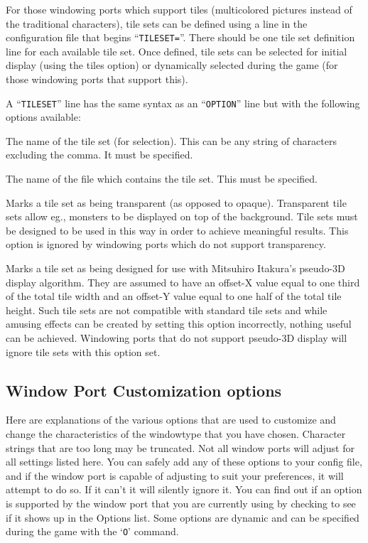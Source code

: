 
For those windowing ports which support tiles (multicolored pictures
instead of the traditional characters), tile sets can be defined using
a line in the configuration file that begins ``{\tt TILESET=}''. There should
be one tile set definition line for each available tile set. Once defined,
tile sets can be selected for initial display (using the tiles option) or
dynamically selected during the game (for those windowing ports that
support this).

A ``{\tt TILESET}'' line has the same syntax as an ``{\tt OPTION}'' line but with
the following options available:
\blist{}

\item[\ib{name}]
The name of the tile set (for selection). This can be any string of characters
excluding the comma. It must be specified.

\item[\ib{file}]
The name of the file which contains the tile set. This must be specified.

\item[\ib{transparent}]
Marks a tile set as being transparent (as opposed to opaque). Transparent
tile sets allow eg., monsters to be displayed on top of the background.
Tile sets must be designed to be used in this way in order to achieve
meaningful results. This option is ignored by windowing ports which do
not support transparency.

\item[\ib{pseudo3D}]
Marks a tile set as being designed for use with Mitsuhiro Itakura's
pseudo-3D display algorithm. They are assumed to have an offset-X value
equal to one third of the total tile width and an offset-Y value equal
to one half of the total tile height. Such tile sets are not compatible
with standard tile sets and while amusing effects can be created by
setting this option incorrectly, nothing useful can be achieved. Windowing
ports that do not support pseudo-3D display will ignore tile sets with
this option set.
\elist
\nd %
\subsection*{Window Port Customization options}


Here are explanations of the various options that are
used to customize and change the characteristics of the
windowtype that you have chosen.
Character strings that are too long may be truncated.
Not all window ports will adjust for all settings listed
here.  You can safely add any of these options to your config
file, and if the window port is capable of adjusting to
suit your preferences, it will attempt to do so. If it
can't it will silently ignore it.  You can find out if an
option is supported by the window port that you are currently
using by checking to see if it shows up in the Options list.
Some options are dynamic and can be specified during the game
with the `{\tt O}' command.
\blist{}

